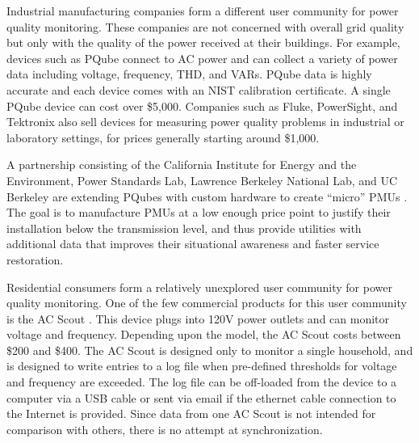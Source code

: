 
Industrial manufacturing companies form a different user community for power quality monitoring. These companies are not concerned with overall grid quality but only with the quality of the power received at their buildings.  For example, devices such as PQube \cite{pqube} connect to AC power and can collect a variety of power data including voltage, frequency, THD, and VARs. PQube data is highly accurate and each device comes with an NIST calibration certificate. A single PQube device can cost over \$5,000.  Companies such as Fluke, PowerSight, and Tektronix also sell devices for measuring power quality problems in industrial or laboratory settings, for prices generally starting around \$1,000.

A partnership consisting of the California Institute for Energy and the Environment, Power Standards Lab, Lawrence Berkeley National Lab, and UC Berkeley are extending PQubes with custom hardware to create ``micro'' PMUs \cite{Meier2013,Meier2014}.  The goal is to manufacture PMUs at a low enough price point to justify their installation below the transmission level, and thus provide utilities with additional data that improves their situational awareness and faster service restoration.  

Residential consumers form a relatively unexplored user community for power quality monitoring.   One of the few commercial products for this user community is the AC Scout \cite{acscout}.  This device plugs into 120V power outlets and can monitor voltage and frequency.  Depending upon the model, the AC Scout costs between \$200 and \$400. The AC Scout is designed only to monitor a single household, and is designed to write entries to a log file when pre-defined thresholds for voltage and frequency are exceeded. The log file can be off-loaded from the device to a computer via a USB cable or sent via email if the ethernet cable connection to the Internet is provided. Since data from one AC Scout is not intended for comparison with others, there is no attempt at synchronization.

